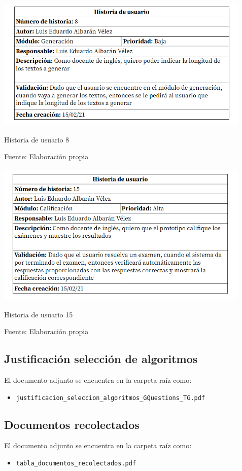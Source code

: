 \documentclass[../Main.tex]{subfiles}
\begin{document}
\newpage   
\thispagestyle{empty} %
        \begin{table}[H]
	\begin{Center}
		\includegraphics[width=4.8in,height=2.5in]{./images/hu_8}
	    \caption{Historia de usuario 8}
	    Fuente: Elaboración propia
        \label{tab:section}
	\end{Center}
    \end{table}


        \begin{table}[H]
	\begin{Center}
		\includegraphics[width=4.8in,height=2.7in]{./images/hu_15}
	    \caption{Historia de usuario 15}
	    Fuente: Elaboración propia
        \label{tab:section}
	\end{Center}
    \end{table}
\subsection*{Justificación selección de algoritmos}
\begin{justify}
El documento adjunto se encuentra en la carpeta raíz como:
\begin{itemize}
    \item \texttt{justificacion\_seleccion\_algoritmos\_GQuestions\_TG.pdf}
\end{itemize}
\subsection*{Documentos recolectados}
El documento adjunto se encuentra en la carpeta raíz como:
\begin{itemize}
    \item \texttt{tabla\_documentos\_recolectados.pdf}
\end{itemize}
\end{justify}
\end{document}

